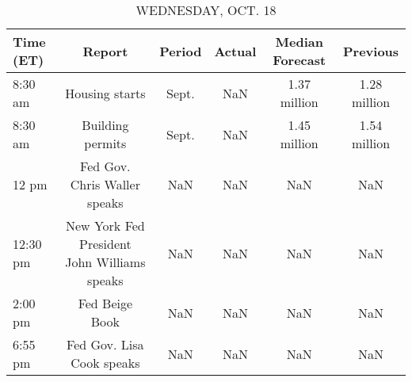 \documentclass{article}%
\begin{document}
%


\begin{table}[htbp]%
\caption{WEDNESDAY, OCT. 18}%
\centering%
\begin{adjustbox}{width=1\textwidth}%
\begin{tabular}{lccccc}
\toprule
Time (ET) &                                      Report & Period & Actual & Median Forecast &     Previous \\
\midrule
  8:30 am &                              Housing starts &  Sept. &    NaN &    1.37 million & 1.28 million \\
  8:30 am &                            Building permits &  Sept. &    NaN &    1.45 million & 1.54 million \\
    12 pm &                Fed Gov. Chris Waller speaks &    NaN &    NaN &             NaN &          NaN \\
 12:30 pm & New York Fed President John Williams speaks &    NaN &    NaN &             NaN &          NaN \\
  2:00 pm &                              Fed Beige Book &    NaN &    NaN &             NaN &          NaN \\
  6:55 pm &                   Fed Gov. Lisa Cook speaks &    NaN &    NaN &             NaN &          NaN \\
\bottomrule
\end{tabular}
%
\end{adjustbox}%
\end{table}

%
\end{document}
